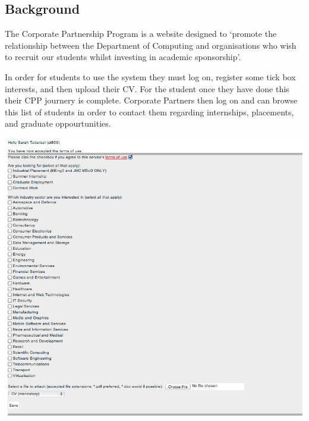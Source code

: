 \subsection{Background}
The Corporate Partnership Program is a website designed to `promote the relationship between the Department of Computing and organisations who wish to recruit our students whilst investing in academic sponsorship'\cite{doc-cpp}.

In order for students to use the system they must log on, register some tick box interests, and then upload their CV.
For the student once they have done this their CPP journery is complete.
Corporate Partners then log on and can browse this list of students in order to contact them regarding internships, placements, and graduate oppourtunities.

\includegraphics[scale=0.5]{images/introduction/old_cpp}
